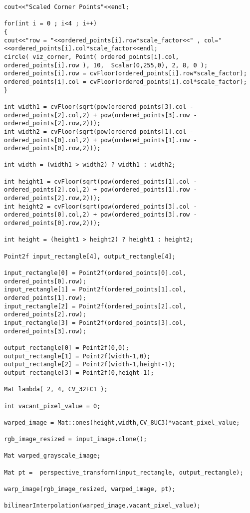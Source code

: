 \begin{lstlisting}
cout<<"Scaled Corner Points"<<endl;

for(int i = 0 ; i<4 ; i++)
{
cout<<"row = "<<ordered_points[i].row*scale_factor<<" , col="<<ordered_points[i].col*scale_factor<<endl;
circle( viz_corner, Point( ordered_points[i].col, ordered_points[i].row ), 10,  Scalar(0,255,0), 2, 8, 0 );
ordered_points[i].row = cvFloor(ordered_points[i].row*scale_factor);
ordered_points[i].col = cvFloor(ordered_points[i].col*scale_factor);
}	

int width1 = cvFloor(sqrt(pow(ordered_points[3].col - ordered_points[2].col,2) + pow(ordered_points[3].row - ordered_points[2].row,2)));
int width2 = cvFloor(sqrt(pow(ordered_points[1].col - ordered_points[0].col,2) + pow(ordered_points[1].row - ordered_points[0].row,2)));

int width = (width1 > width2) ? width1 : width2;

int height1 = cvFloor(sqrt(pow(ordered_points[1].col - ordered_points[2].col,2) + pow(ordered_points[1].row - ordered_points[2].row,2)));
int height2 = cvFloor(sqrt(pow(ordered_points[3].col - ordered_points[0].col,2) + pow(ordered_points[3].row - ordered_points[0].row,2)));

int height = (height1 > height2) ? height1 : height2;

Point2f input_rectangle[4], output_rectangle[4];

input_rectangle[0] = Point2f(ordered_points[0].col, ordered_points[0].row);
input_rectangle[1] = Point2f(ordered_points[1].col, ordered_points[1].row);
input_rectangle[2] = Point2f(ordered_points[2].col, ordered_points[2].row);
input_rectangle[3] = Point2f(ordered_points[3].col, ordered_points[3].row);

output_rectangle[0] = Point2f(0,0);
output_rectangle[1] = Point2f(width-1,0);
output_rectangle[2] = Point2f(width-1,height-1);
output_rectangle[3] = Point2f(0,height-1);

Mat lambda( 2, 4, CV_32FC1 );

int vacant_pixel_value = 0;

warped_image = Mat::ones(height,width,CV_8UC3)*vacant_pixel_value;

rgb_image_resized = input_image.clone();

Mat warped_grayscale_image;

Mat pt =  perspective_transform(input_rectangle, output_rectangle);

warp_image(rgb_image_resized, warped_image, pt);

bilinearInterpolation(warped_image,vacant_pixel_value);


\end{lstlisting}
